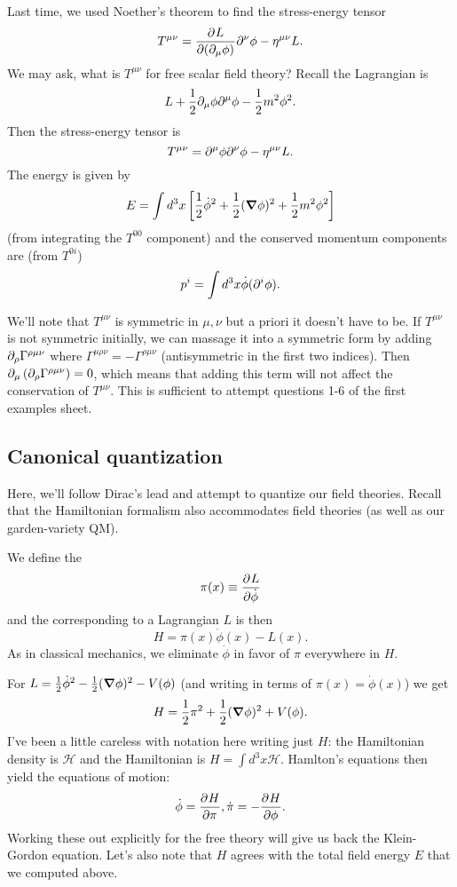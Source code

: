 Last time, we used Noether's theorem to find the stress-energy tensor
$$T^{\mu\nu}=\P{L}{(\p_\mu\phi)}\p^\nu \phi - \eta^{\mu\nu} L.$$
We may ask, what is $T^{\mu\nu}$ for free scalar field theory? Recall the Lagrangian is
$$L+\frac{1}{2}\p_\mu \phi \p^\mu \phi - \frac{1}{2} m^2 \phi^2.$$
Then the stress-energy tensor is
$$T^{\mu\nu}=\p^\mu \phi \p^\nu \phi - \eta^{\mu\nu} L.$$
The energy is given by 
$$E=\int d^3 x \left[\frac{1}{2} \dot \phi^2 +\frac{1}{2}(\grad \phi)^2 +\frac{1}{2}m^2 \phi^2 \right]$$
(from integrating the $T^{00}$ component) and the conserved momentum components are (from $T^{0i}$)
$$p^i= \int d^3x \dot \phi (\p^i \phi).$$

We'll note that $T^{\mu\nu}$ is symmetric in $\mu,\nu$ but a priori it doesn't have to be. If $T^{\mu\nu}$ is not symmetric initially, we can massage it into a symmetric form by adding $\p_\rho \Gamma^{\rho\mu\nu}$ where $\Gamma^{\mu\rho\nu}=-\Gamma^{\rho\mu\nu}$ (antisymmetric in the first two indices). Then $\p_\mu \left(\p_\rho \Gamma^{\rho\mu\nu}\right)=0$, which means that adding this term will not affect the conservation of $T^{\mu\nu}$. This is sufficient to attempt questions 1-6 of the first examples sheet.

\subsection*{Canonical quantization} Here, we'll follow Dirac's lead and attempt to quantize our field theories. Recall that the Hamiltonian formalism also accommodates field theories (as well as our garden-variety QM). 
\begin{defn}
We define the 
$$\pi(x)\equiv \P{L}{\dot \phi}$$
and the  corresponding to a Lagrangian $L$ is then
$$H=\pi(x) \dot \phi(x) - L(x).$$
As in classical mechanics, we eliminate $\dot\phi$ in favor of $\pi$ everywhere in $H$.
\end{defn}

\begin{exm}
For $L=\frac{1}{2}\dot \phi^2 -\frac{1}{2}(\grad \phi)^2 - V(\phi)$ (and writing in terms of $\pi(x)=\dot \phi(x)$) we get
$$H=\frac{1}{2}\pi^2 +\frac{1}{2}(\grad \phi)^2+ V(\phi).$$
I've been a little careless with notation here writing just $H$: the Hamiltonian density is $\mathcal{H}$ and the Hamiltonian is $H=\int d^3 x \mathcal{H}$. Hamlton's equations then yield the equations of motion:
$$\dot \phi = \P{H}{\pi}, \dot \pi = -\P{H}{\phi}.$$
Working these out explicitly for the free theory will give us back the Klein-Gordon equation. Let's also note that $H$ agrees with the total field energy $E$ that we computed above.
\end{exm}

